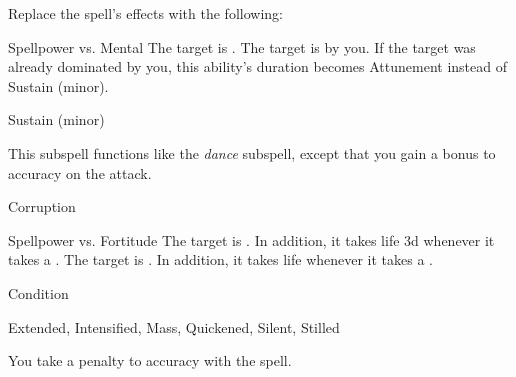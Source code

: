 Replace the spell's effects with the following:
\begin{spellcontent}
\begin{augmenteffects}
\begin{spellattack}{Spellpower vs. Mental}
\spellsuccess The target is .
\spellcritical
The target is  by you.
If the target was already dominated by you, this ability's duration becomes Attunement instead of Sustain (minor).
\end{spellattack}
\spelldur Sustain (minor)
\end{augmenteffects}
\end{spellcontent}
This subspell functions like the \textit{dance} subspell, except that you gain a  bonus to accuracy on the attack.
\begin{spellsection}{Corruption}
\begin{spellheader}
\end{spellheader}
\begin{spellcontent}
\begin{spelltargetinginfo}
\end{spelltargetinginfo}
\begin{spelleffects}
\begin{spellattack}{Spellpower vs. Fortitude}
\spellsuccess
The target is .
In addition, it takes life  \minus3d whenever it takes a .
\spellcritical
The target is .
In addition, it takes life  whenever it takes a .
\end{spellattack}
\spelldur Condition
\end{spelleffects}
\end{spellcontent}
\begin{spellfooter}
 Extended, Intensified, Mass, Quickened, Silent, Stilled
\end{spellfooter}
\begin{spellsubcontent}
\begin{spellcantrip}
You take a  penalty to accuracy with the spell.
\end{spellcantrip}
\end{spellsubcontent}
\end{spellsection}
